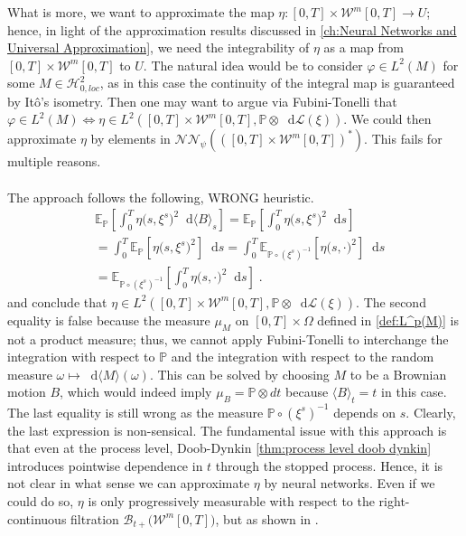 \documentclass[11pt]{report}
\newcommand{\diff}{\mathop{}\!\mathrm{d}}
\theoremstyle{plain} %
\theoremstyle{definition} %
\theoremstyle{remark} %
\begin{document}
 What is more, we want to approximate the map \(\eta:[0,T]\times\mathcal{W}^m[0,T]\to U\); hence, in light of the approximation results discussed in \cref{ch:Neural Networks and Universal Approximation}, we need the integrability of \(\eta\) as a map from \([0,T]\times\mathcal{W}^m[0,T]\) to \(U\). The natural idea would be to consider \(\varphi\in L^2(M)\) for some \(M\in\mathcal{H}_{0,loc}^2\), as in this case the continuity of the integral map is guaranteed by Itô's isometry. Then one may want to argue via Fubini-Tonelli that \(\varphi\in L^2(M)\iff \eta\in L^2([0,T]\times\mathcal{W}^m[0,T],\mathbb{P}\otimes\diff\mathcal{L}(\xi))\). We could then approximate \(\eta\) by elements in \(\mathcal{NN}_\psi(\left([0,T]\times\mathcal{W}^m[0,T]\right)^*)\). This fails for multiple reasons. \\\\
The approach follows the following, WRONG heuristic.
\begin{align}
   & \mathbb{E}_{\mathbb{P}}[\int_0^T\eta\bigl(s,\xi^s\bigr)^2\diff \langle B\rangle_s]= \mathbb{E}_{\mathbb{P}}[\int_0^T\eta\bigl(s,\xi^s\bigr)^2\diff s]
   \\&=\int_0^T\mathbb{E}_{\mathbb{P}}[\eta\bigl(s,\xi^s\bigr)^2]\diff s=\int_0^T\mathbb{E}_{\mathbb{P}\circ (\xi^{s})^{-1}}[\eta\bigl(s,\cdot\bigr)^2]\diff s
   \\&=\mathbb{E}_{\mathbb{P}\circ (\xi^{s})^{-1}}[\int_0^T\eta\bigl(s,\cdot\bigr)^2\diff s]\;.
\end{align}
and conclude that \(\eta\in L^2([0,T]\times\mathcal{W}^m[0,T],\mathbb{P}\otimes\diff\mathcal{L}(\xi))\). The second equality is false because the measure \(\mu_M\) on \([0,T]\times \Omega\) defined in \cref{def:L^p(M)} is not a product measure; thus, we cannot apply Fubini-Tonelli to interchange the integration with respect to \(\mathbb{P}\) and the integration with respect to the random measure \(\omega\mapsto \diff \langle M\rangle(\omega)\). This can be solved by choosing \(M\) to be a Brownian motion \(B\), which would indeed imply \(\mu_B=\mathbb{P}\otimes dt\) because \(\langle B\rangle_t=t\) in this case. The last equality is still wrong as the measure \(\mathbb{P}\circ (\xi^{s})^{-1}\) depends on \(s\). Clearly, the last expression is non-sensical. The fundamental issue with this approach is that even at the process level, Doob-Dynkin \cref{thm:process level doob dynkin} introduces pointwise dependence in \(t\) through the stopped process. 
Hence, it is not clear in what sense we can approximate \(\eta\) by neural networks. Even if we could do so, \(\eta\) is only progressively measurable with respect to the right-continuous filtration \(\mathcal{B}_{t+}\bigl(\mathcal{W}^m[0,T]\bigr)\), but as shown in \parencite[Problem.~7.1]{KaratzasShreve1991Brownian}.
\end{document}
